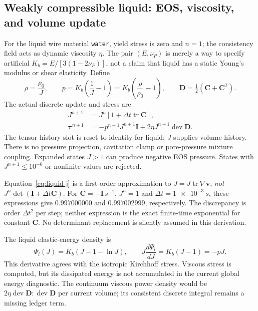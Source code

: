 \subsection{Weakly compressible liquid: EOS, viscosity, and volume update}
For the liquid wire material \nolinkurl{water}, yield stress is zero and $n=1$;
the consistency field acts as dynamic viscosity $\eta$. The pair $(E,\nu_P)$
is merely a way to specify artificial $K_b=E/[3(1-2\nu_P)]$, not a claim that
liquid has a static Young's modulus or shear elasticity. Define
\begin{equation}
 \rho=\frac{\rho_0}{J},\qquad
 p=K_b\left(\frac1J-1\right)=K_b\left(\frac\rho{\rho_0}-1\right),\qquad
 \mathbf D=\tfrac12(\mathbf C+\mathbf C^T).
\end{equation}
The actual discrete update and stress are
\begin{align}
 J^{n+1}&=J^n[1+\Delta t\operatorname{tr}\mathbf C],\label{eq:liquid-j}\\
 \boldsymbol\tau^{n+1}&=-p^{n+1}J^{n+1}\mathbf I
                  +2\eta J^{n+1}\operatorname{dev}\mathbf D.
 \label{eq:liquid-stress}
\end{align}
The tensor-history slot is reset to identity for liquid; $J$ supplies volume
history. There is no pressure projection, cavitation clamp or pore-pressure
mixture coupling. Expanded states $J>1$ can produce negative EOS pressure.
States with $J^{n+1}\leq10^{-6}$ or nonfinite values are rejected.

Equation~\eqref{eq:liquid-j} is a first-order approximation to
$\dot J=J\operatorname{tr}\nabla\mathbf v$, \emph{not}
$J^n\det(\mathbf I+\Delta t\mathbf C)$. For $\mathbf C=-\mathbf I\,\si{s^{-1}}$,
$J^n=1$ and $\Delta t=\SI{1e-3}{s}$, these expressions give $0.997000000$
and $0.997002999$, respectively. The discrepancy is order $\Delta t^2$ per
step; neither expression is the exact finite-time exponential for constant
$\mathbf C$. No determinant replacement is silently assumed in this derivation.

The liquid elastic-energy density is
\begin{equation}
 \Psi_l(J)=K_b(J-1-\ln J),\qquad
 J\frac{d\Psi_l}{dJ}=K_b(J-1)=-pJ.
\end{equation}
This derivative agrees with the isotropic Kirchhoff stress. Viscous stress is
computed, but its dissipated energy is not accumulated in the current global
energy diagnostic. The continuum viscous power density would be
$2\eta\operatorname{dev}\mathbf D:\operatorname{dev}\mathbf D$ per current volume;
its consistent discrete integral remains a missing ledger term.


